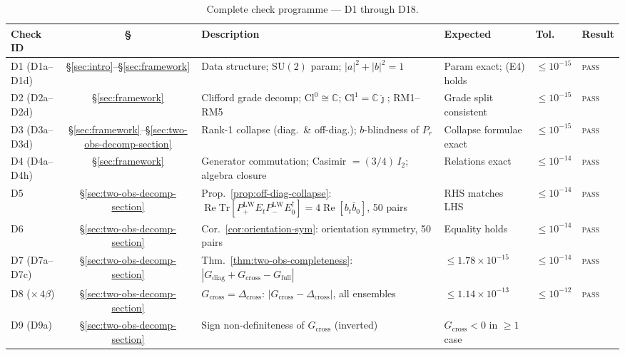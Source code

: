 \documentclass[12pt]{article}
\numberwithin{equation}{section}
\theoremstyle{plain}
\theoremstyle{definition}
\theoremstyle{remark}
\newcommand{\cl}{\mathrm{Cl}}              %
\newcommand{\su}{\mathrm{SU}}              %
\newcommand{\tr}{\mathrm{Tr}}              %
\newcommand{\Cplx}{\mathbb{C}}             %
\newcommand{\jhat}{\hat{\jmath}}           %
\newcommand{\Cjhat}{\Cplx\jhat}            %
\newcommand{\Gdiag}{G_{\mathrm{diag}}}     %
\newcommand{\Gcross}{G_{\mathrm{cross}}}   %
\newcommand{\Gfull}{G_{\mathrm{full}}}     %
\newcommand{\Dcross}{\Delta_{\mathrm{cross}}}  %
\newcommand{\PLW}{P^{\mathrm{LW}}}         %
\begin{document}
		\begin{table}[ht]
			\centering
			\caption{Complete check programme --- D1 through D18.}
			\label{tab:check-programme}
			\footnotesize
			\setlength{\tabcolsep}{4pt}
			\renewcommand{\arraystretch}{1.15}
			\begin{tabular}{@{}l c p{4.4cm} p{3.2cm} l l@{}}
				\toprule
				\textbf{Check ID} & \textbf{\S} & \textbf{Description}
				& \textbf{Expected} & \textbf{Tol.} & \textbf{Result}\\
				\midrule
				D1 (D1a--D1d) & \S\ref{sec:intro}--\S\ref{sec:framework}
				& Data structure; $\su(2)$ param; $|a|^2 + |b|^2 = 1$
				& Param exact; (E4) holds
				& $\leq 10^{-15}$ & \textsc{pass}\\
				D2 (D2a--D2d) & \S\ref{sec:framework}
				& Clifford grade decomp; $\cl^{0}\cong\Cplx$;
				$\cl^{1} = \Cjhat$; RM1--RM5
				& Grade split consistent
				& $\leq 10^{-15}$ & \textsc{pass}\\
				D3 (D3a--D3d)
				& \S\ref{sec:framework}--\S\ref{sec:two-obs-decomp-section}
				& Rank-1 collapse (diag.\ \& off-diag.);
				$b$-blindness of $P_r$
				& Collapse formulae exact
				& $\leq 10^{-15}$ & \textsc{pass}\\
				D4 (D4a--D4h) & \S\ref{sec:framework}
				& Generator commutation;
				Casimir $= (3/4)\,I_2$; algebra closure
				& Relations exact
				& $\leq 10^{-14}$ & \textsc{pass}\\
				D5 & \S\ref{sec:two-obs-decomp-section}
				& Prop.~\ref{prop:off-diag-collapse}:
				$\operatorname{Re}\tr[\PLW_+ E_t \PLW_- E_0^{\dagger}]
				= 4\operatorname{Re}[b_t \bar{b}_0]$, 50 pairs
				& RHS matches LHS
				& $\leq 10^{-14}$ & \textsc{pass}\\
				D6 & \S\ref{sec:two-obs-decomp-section}
				& Cor.~\ref{cor:orientation-sym}:
				orientation symmetry, 50 pairs
				& Equality holds
				& $\leq 10^{-14}$ & \textsc{pass}\\
				D7 (D7a--D7c) & \S\ref{sec:two-obs-decomp-section}
				& Thm.~\ref{thm:two-obs-completeness}:
				$|\Gdiag + \Gcross - \Gfull|$
				& $\leq 1.78\times 10^{-15}$
				& $\leq 10^{-14}$ & \textsc{pass}\\
				D8 ($\times\,4\beta$) & \S\ref{sec:two-obs-decomp-section}
				& $\Gcross = \Dcross$:
				$|\Gcross - \Dcross|$, all ensembles
				& $\leq 1.14\times 10^{-13}$
				& $\leq 10^{-12}$ & \textsc{pass}\\
				D9 (D9a) & \S\ref{sec:two-obs-decomp-section}
				& Sign non-definiteness of $\Gcross$ (inverted)
				& $\Gcross < 0$ in $\geq 1$ case

\end{tabular}
\end{table}
\end{document}
